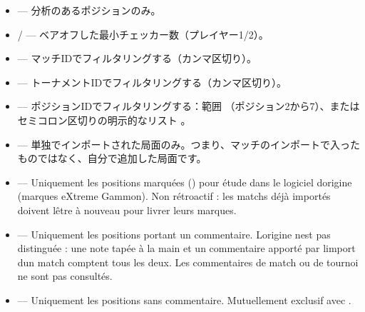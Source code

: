 \documentclass[letterpaper,10pt,dvipdfmx]{sphinxmanual}
\begin{document}
\begin{itemize}
\item {} 
\sphinxAtStartPar
{} — 分析のあるポジションのみ。

\item {} 
\sphinxAtStartPar
{} /  — ベアオフした最小チェッカー数（プレイヤー1/2）。

\item {} 
\sphinxAtStartPar
{} — マッチIDでフィルタリングする（カンマ区切り）。

\item {} 
\sphinxAtStartPar
{} — トーナメントIDでフィルタリングする（カンマ区切り）。

\item {} 
\sphinxAtStartPar
{} — ポジションIDでフィルタリングする：範囲 （ポジション2から7）、またはセミコロン区切りの明示的なリスト 。

\item {} 
\sphinxAtStartPar
{} — 単独でインポートされた局面のみ。つまり、マッチのインポートで入ったものではなく、自分で追加した局面です。

\item {} 
\sphinxAtStartPar
{} — Uniquement les positions marquées () pour étude dans
le logiciel d\textquotesingle{}origine (marques eXtreme Gammon). Non rétroactif : les
matchs déjà importés doivent l\textquotesingle{}être à nouveau pour livrer leurs marques.

\item {} 
\sphinxAtStartPar
{} — Uniquement les positions portant un commentaire.
L\textquotesingle{}origine n\textquotesingle{}est pas distinguée : une note tapée à la main et un commentaire
apporté par l\textquotesingle{}import d\textquotesingle{}un match comptent tous les deux. Les commentaires de
match ou de tournoi ne sont pas consultés.

\item {} 
\sphinxAtStartPar
{} — Uniquement les positions sans commentaire. Mutuellement
exclusif avec .

\end{itemize}
\end{document}
